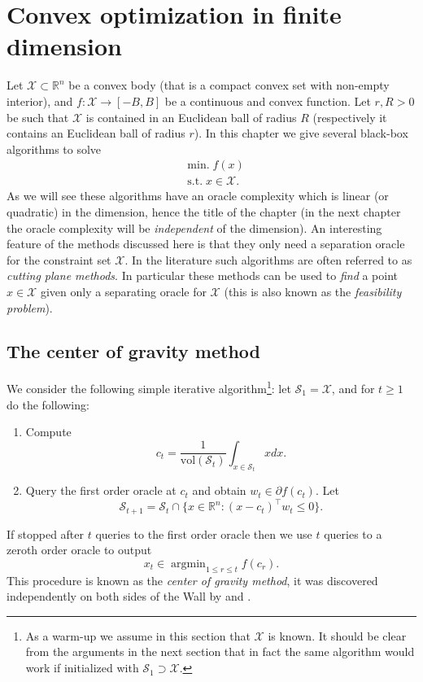 \documentclass[openany]{now}
\newcommand{\R}{\mathbb{R}}
\newcommand{\cX}{\mathcal{X}}
\newcommand{\cS}{\mathcal{S}}
\newcommand{\argmin}{\mathop{\mathrm{argmin}}}
\begin{document}
%
 
\chapter{Convex optimization in finite dimension}
\label{finitedim}
Let $\mathcal{X} \subset \R^n$ be a convex body (that is a compact convex set with non-empty interior), and $f : \mathcal{X} \rightarrow [-B,B]$ be a continuous and convex function. Let $r, R>0$ be such that $\mathcal{X}$ is contained in an Euclidean ball of radius $R$ (respectively it contains an Euclidean ball of radius $r$). In this chapter we give several black-box algorithms to solve 
\begin{align*}
& \mathrm{min.} \; f(x) \\
& \text{s.t.} \; x \in \cX .
\end{align*}
As we will see these algorithms have an oracle complexity which is linear (or quadratic) in the dimension, hence the title of the chapter (in the next chapter the oracle complexity will be {\em independent} of the dimension). An interesting feature of the methods discussed here is that they only need a separation oracle for the constraint set $\cX$. In the literature such algorithms are often referred to as {\em cutting plane methods}. In particular these methods can be used to {\em find} a point $x \in \cX$ given only a separating oracle for $\cX$ (this is also known as the {\em feasibility problem}). 

\section{The center of gravity method} \label{sec:gravity}
We consider the following simple iterative algorithm\footnote{As a warm-up we assume in this section that $\cX$ is known. It should be clear from the arguments in the next section that in fact the same algorithm would work if initialized with $\cS_1 \supset \cX$.}: let $\cS_1= \cX$, and for $t \geq 1$ do the following:
\begin{enumerate}
\item Compute
\begin{equation}
c_t = \frac{1}{\mathrm{vol}(\cS_t)} \int_{x \in \cS_t} x dx .
\end{equation}
\item Query the first order oracle at $c_t$ and obtain $w_t \in \partial f (c_t)$. Let
$$\cS_{t+1} = \cS_t \cap \{x \in \R^n : (x-c_t)^{\top} w_t \leq 0\} .$$
\end{enumerate}
If stopped after $t$ queries to the first order oracle then we use $t$ queries to a zeroth order oracle to output
$$x_t\in \argmin_{1 \leq r \leq t} f(c_r) .$$
This procedure is known as the {\em center of gravity method}, it was discovered independently on both sides of the Wall by \cite{Lev65} and \cite{New65}.
\end{document}
